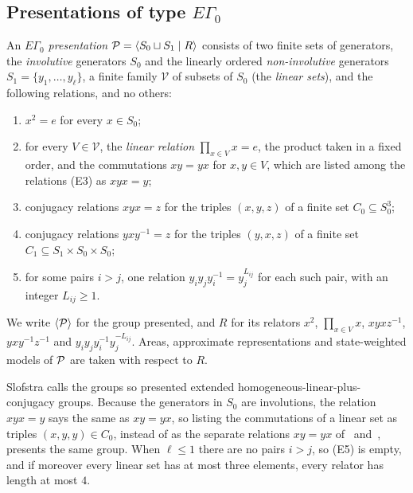 \subsection{Presentations of type \texorpdfstring{$E\Gamma_0$}{EGamma0}}

\begin{definition}\label{def:EG0}
An \emph{$E\Gamma_0$ presentation} $\mathcal P=\langle S_0\sqcup S_1\mid R\rangle$ consists of two finite sets of generators, the
\emph{involutive} generators $S_0$ and the linearly ordered \emph{non-involutive} generators $S_1=\{y_1,\dots,y_\ell\}$, a finite family
$\mathcal V$ of subsets of $S_0$ (the \emph{linear sets}), and the following relations, and no others:
\begin{enumerate}[label=(E\arabic*),itemsep=0pt]
\item $x^2=e$ for every $x\in S_0$;
\item for every $V\in\mathcal V$, the \emph{linear relation} $\prod_{x\in V}x=e$, the product taken in a fixed order, and the commutations
$xy=yx$ for $x,y\in V$, which are listed among the relations (E3) as $xyx=y$;
\item conjugacy relations $xyx=z$ for the triples $(x,y,z)$ of a finite set $C_0\subseteq S_0^3$;
\item conjugacy relations $yxy^{-1}=z$ for the triples $(y,x,z)$ of a finite set $C_1\subseteq S_1\times S_0\times S_0$;
\item for some pairs $i>j$, one relation $y_iy_jy_i^{-1}=y_j^{L_{ij}}$ for each such pair, with an integer $L_{ij}\ge1$.
\end{enumerate}
We write $\langle\mathcal P\rangle$ for the group presented, and $R$ for its relators $x^2$, $\prod_{x\in V}x$, $xyxz^{-1}$, $yxy^{-1}z^{-1}$ and
$y_iy_jy_i^{-1}y_j^{-L_{ij}}$. Areas, approximate representations and state-weighted models of $\mathcal P$ are taken with respect to $R$.
\end{definition}

Slofstra calls the groups so presented extended homogeneous-linear-plus-conjugacy groups. Because the generators in $S_0$ are
involutions, the relation $xyx=y$ says the same as $xy=yx$, so listing the commutations of a linear set as triples $(x,y,y)\in C_0$, instead of
as the separate relations $xy=yx$ of~\cite[Def.~4.7]{Slo19} and~\cite[\S6]{SV18}, presents the same group. When $\ell\le1$ there are no pairs $i>j$, so (E5) is empty, and if moreover every linear set has at most three
elements, every relator has length at most $4$.

